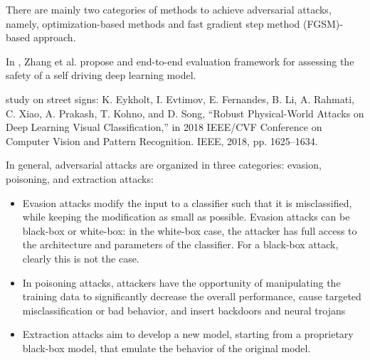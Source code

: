 There are mainly two categories of methods to achieve adversarial attacks, namely, optimization-based methods and fast gradient step method (FGSM)-based approach.


In \cite{DBLP:journals/iotj/ZhangLWWLJ22}, Zhang et al. propose and end-to-end evaluation framework for assessing the safety of a self driving deep learning model.



study on street signs: K. Eykholt, I. Evtimov, E. Fernandes, B. Li, A. Rahmati, C. Xiao,
A. Prakash, T. Kohno, and D. Song, “Robust Physical-World Attacks on
Deep Learning Visual Classification,” in 2018 IEEE/CVF Conference on
Computer Vision and Pattern Recognition. IEEE, 2018, pp. 1625–1634.


In general, adversarial attacks are organized in three categories: evasion, poisoning, and extraction attacks:
\begin{itemize}
    \item Evasion attacks modify the input to a classifier such that it is misclassified, while keeping the modification as small as possible. Evasion attacks can be black-box or white-box: in the white-box case, the attacker has full access to the architecture and parameters of the classifier. For a black-box attack, clearly this is not the case.
    \item In poisoning attacks, attackers have the opportunity of manipulating the training data to significantly decrease the overall performance, cause targeted misclassification or bad behavior, and insert backdoors and neural trojans
    \item Extraction attacks aim to develop a new model, starting from a proprietary black-box model, that emulate the behavior of the original model.
\end{itemize}
